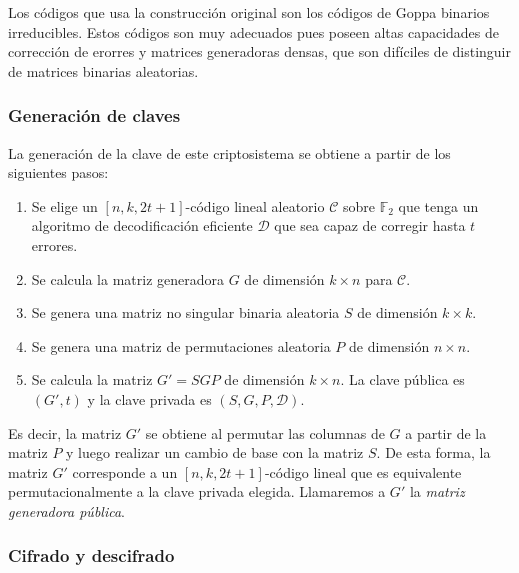 Los códigos que usa la construcción original son los códigos de Goppa binarios irreducibles. Estos códigos son muy adecuados pues poseen altas capacidades de corrección de erorres y matrices generadoras densas, que son difíciles de distinguir de matrices binarias aleatorias.

\subsubsection{Generación de claves}

La generación de la clave de este criptosistema se obtiene a partir de los siguientes pasos:

\begin{enumerate}
    \item Se elige un $[n, k, 2t + 1]$-código lineal aleatorio $\mathcal{C}$ sobre $\mathbb{F}_2$ que tenga un algoritmo de decodificación eficiente $\mathcal{D}$ que sea capaz de corregir hasta $t$ errores.
    \item Se calcula la matriz generadora $G$ de dimensión $k \times n$ para $\mathcal{C}$.
    \item Se genera una matriz no singular binaria aleatoria $S$ de dimensión $k \times k$.
    \item Se genera una matriz de permutaciones aleatoria $P$ de dimensión $n \times n$.
    \item Se calcula la matriz $G' = SGP$ de dimensión $k \times n$. La clave pública es $(G', t)$ y la clave privada es $(S, G, P, \mathcal{D})$.
\end{enumerate}

Es decir, la matriz $G'$ se obtiene al permutar las columnas de $G$ a partir de la matriz $P$ y luego realizar un cambio de base con la matriz $S$. De esta forma, la matriz $G'$ corresponde a un $[n, k, 2t + 1]$-código lineal que es equivalente permutacionalmente a la clave privada elegida. Llamaremos a $G'$ la \emph{matriz generadora pública}.

\subsubsection{Cifrado y descifrado}

